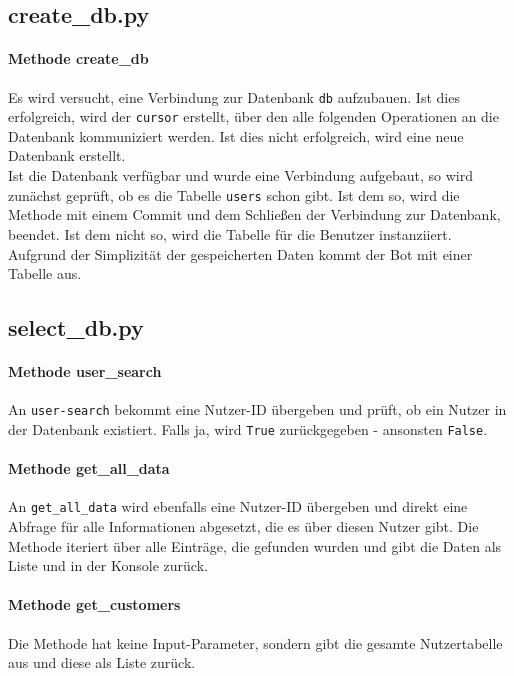         \subsection{create\_db.py}
            \paragraph{Methode create\_db}
            Es wird versucht, eine Verbindung zur Datenbank \verb|db| aufzubauen. Ist dies erfolgreich, wird der \verb|cursor| erstellt, über den alle folgenden Operationen an die Datenbank kommuniziert werden. Ist dies nicht erfolgreich, wird eine neue Datenbank erstellt.\\
            Ist die Datenbank verfügbar und wurde eine Verbindung aufgebaut, so wird zunächst geprüft, ob es die Tabelle \verb|users| schon gibt. Ist dem so, wird die Methode mit einem Commit und dem Schließen der Verbindung zur Datenbank, beendet. Ist dem nicht so, wird die Tabelle für die Benutzer instanziiert. Aufgrund der Simplizität der gespeicherten Daten kommt der Bot mit einer Tabelle aus.


        \subsection{select\_db.py} \label{select_db.py}

            \paragraph{Methode user\_search}
            An \verb|user-search| bekommt eine Nutzer-ID übergeben und prüft, ob ein Nutzer in der Datenbank existiert. Falls ja, wird \verb|True| zurückgegeben - ansonsten \verb|False|.

            \paragraph{Methode get\_all\_data}
                An \verb|get_all_data| wird ebenfalls eine Nutzer-ID übergeben und direkt eine Abfrage für alle Informationen abgesetzt, die es über diesen Nutzer gibt. Die Methode iteriert über alle Einträge, die gefunden wurden und gibt die Daten als Liste und in der Konsole zurück.
                
            \paragraph{Methode get\_customers}
                Die Methode hat keine Input-Parameter, sondern gibt die gesamte Nutzertabelle aus und diese als Liste zurück.

